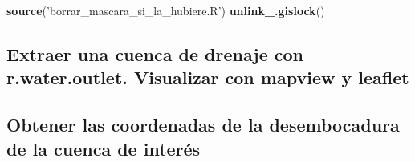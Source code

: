 \documentclass[11pt,]{article}
\newenvironment{Shaded}{\begin{snugshade}}{\end{snugshade}}
\newcommand{\KeywordTok}[1]{\textcolor[rgb]{0.13,0.29,0.53}{\textbf{#1}}}
\newcommand{\DataTypeTok}[1]{\textcolor[rgb]{0.13,0.29,0.53}{#1}}
\newcommand{\StringTok}[1]{\textcolor[rgb]{0.31,0.60,0.02}{#1}}
\newcommand{\OtherTok}[1]{\textcolor[rgb]{0.56,0.35,0.01}{#1}}
\newcommand{\OperatorTok}[1]{\textcolor[rgb]{0.81,0.36,0.00}{\textbf{#1}}}
\newcommand{\NormalTok}[1]{#1}
\begin{document}
\begin{Shaded}
\begin{Highlighting}[]
\KeywordTok{source}\NormalTok{(}\StringTok{'borrar_mascara_si_la_hubiere.R'}\NormalTok{)}
\KeywordTok{unlink_.gislock}\NormalTok{()}
\end{Highlighting}
\end{Shaded}

\subsection{Extraer una cuenca de drenaje con r.water.outlet. Visualizar
con mapview y
leaflet}\label{extraer-una-cuenca-de-drenaje-con-r.water.outlet.-visualizar-con-mapview-y-leaflet}

\begin{Shaded}
\end{Shaded}

\begin{Shaded}
\end{Shaded}

\subsection{Obtener las coordenadas de la desembocadura de la cuenca de
interés}\label{obtener-las-coordenadas-de-la-desembocadura-de-la-cuenca-de-interuxe9s}
\end{document}
